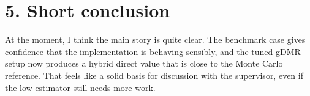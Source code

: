 \documentclass[11pt]{article}
\begin{document}
\section*{5. Short conclusion}

At the moment, I think the main story is quite clear. The benchmark case gives confidence that the implementation
is behaving sensibly, and the tuned gDMR setup now produces a hybrid direct value that is close to the Monte Carlo
reference. That feels like a solid basis for discussion with the supervisor, even if the low estimator still needs
more work.
\end{document}
